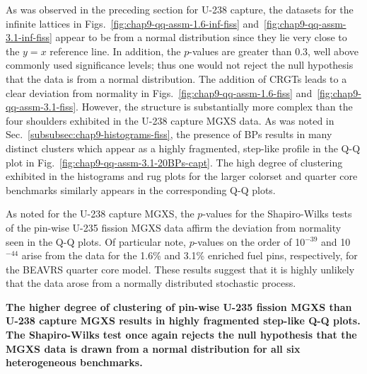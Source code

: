 As was observed in the preceding section for U-238 capture, the datasets for the infinite lattices in Figs.~\ref{fig:chap9-qq-assm-1.6-inf-fiss} and~\ref{fig:chap9-qq-assm-3.1-inf-fiss} appear to be from a normal distribution since they lie very close to the $y = x$ reference line. In addition, the $p$-values are greater than 0.3, well above commonly used significance levels; thus one would not reject the null hypothesis that the data is from a normal distribution. The addition of \acp{CRGT} leads to a clear deviation from normality in Figs.~\ref{fig:chap9-qq-assm-1.6-fiss} and~\ref{fig:chap9-qq-assm-3.1-fiss}. However, the structure is substantially more complex than the four shoulders exhibited in the U-238 capture \ac{MGXS} data. As was noted in Sec.~\ref{subsubsec:chap9-histograms-fiss}, the presence of \acp{BP} results in many distinct clusters which appear as a highly fragmented, step-like profile in the \ac{Q-Q} plot in Fig.~\ref{fig:chap9-qq-assm-3.1-20BPs-capt}. The high degree of clustering exhibited in the histograms and rug plots for the larger colorset and quarter core benchmarks similarly appears in the corresponding \ac{Q-Q} plots.

As noted for the U-238 capture \ac{MGXS}, the $p$-values for the Shapiro-Wilks tests of the pin-wise U-235 fission \ac{MGXS} data affirm the deviation from normality seen in the \ac{Q-Q} plots. Of particular note, $p$-values on the order of 10$^{-39}$ and 10$^{-44}$ arise from the data for the 1.6\% and 3.1\% enriched fuel pins, respectively, for the \ac{BEAVRS} quarter core model. These results suggest that it is highly unlikely that the data arose from a normally distributed stochastic process.


\begin{emphbox}
\textbf{The higher degree of clustering of pin-wise U-235 fission \ac{MGXS} than U-238 capture \ac{MGXS} results in highly fragmented step-like \ac{Q-Q} plots. The Shapiro-Wilks test once again rejects the null hypothesis that the \ac{MGXS} data is drawn from a normal distribution for all six heterogeneous benchmarks.}
\end{emphbox}


